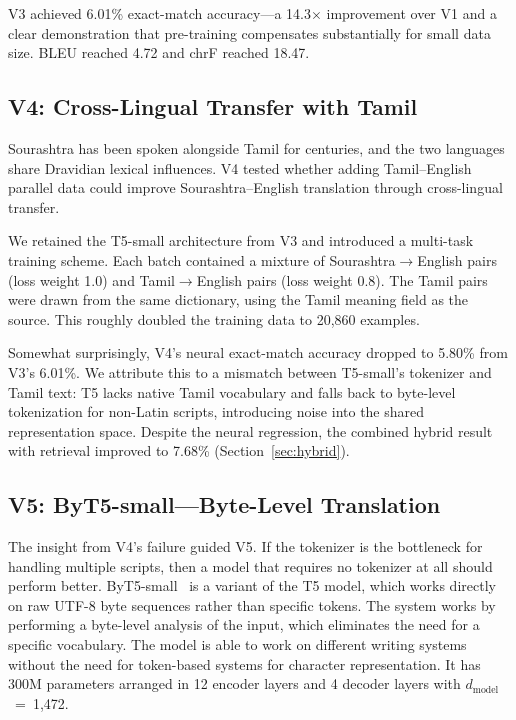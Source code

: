 \documentclass[conference]{IEEEtran}
\begin{document}
V3 achieved 6.01\% exact-match accuracy---a 14.3$\times$ improvement over V1 and a clear demonstration that pre-training compensates substantially for small data size. BLEU reached 4.72 and chrF reached 18.47.

\subsection{V4: Cross-Lingual Transfer with Tamil}

Sourashtra has been spoken alongside Tamil for centuries, and the two languages share Dravidian lexical influences. V4 tested whether adding Tamil--English parallel data could improve Sourashtra--English translation through cross-lingual transfer.

We retained the T5-small architecture from V3 and introduced a multi-task training scheme. Each batch contained a mixture of Sourashtra$\rightarrow$English pairs (loss weight 1.0) and Tamil$\rightarrow$English pairs (loss weight 0.8). The Tamil pairs were drawn from the same dictionary, using the Tamil meaning field as the source. This roughly doubled the training data to 20,860 examples.

Somewhat surprisingly, V4's neural exact-match accuracy dropped to 5.80\% from V3's 6.01\%. We attribute this to a mismatch between T5-small's tokenizer and Tamil text: T5 lacks native Tamil vocabulary and falls back to byte-level tokenization for non-Latin scripts, introducing noise into the shared representation space. Despite the neural regression, the combined hybrid result with retrieval improved to 7.68\% (Section~\ref{sec:hybrid}).

\subsection{V5: ByT5-small---Byte-Level Translation}

The insight from V4's failure guided V5. If the tokenizer is the bottleneck for handling multiple scripts, then a model that requires no tokenizer at all should perform better. ByT5-small~\cite{xue2022byt5} is a variant of the T5 model, which works directly on raw UTF-8 byte sequences rather than specific tokens. The system works by performing a byte-level analysis of the input, which eliminates the need for a specific vocabulary. The model is able to work on different writing systems without the need for token-based systems for character representation. It has 300M parameters arranged in 12 encoder layers and 4 decoder layers with $d_\text{model}$~=~1,472.
\end{document}
